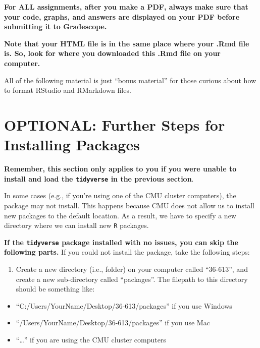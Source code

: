 \documentclass[
]{article}
\providecommand{\tightlist}{%
  \setlength{\itemsep}{0pt}\setlength{\parskip}{0pt}}
\begin{document}
\textbf{For ALL assignments, after you make a PDF, always make sure that
your code, graphs, and answers are displayed on your PDF before
submitting it to Gradescope.}

\textbf{Note that your HTML file is in the same place where your .Rmd
file is. So, look for where you downloaded this .Rmd file on your
computer.}

All of the following material is just ``bonus material'' for those
curious about how to format RStudio and RMarkdown files.

\hypertarget{optional-further-steps-for-installing-packages}{%
\section{OPTIONAL: Further Steps for Installing
Packages}\label{optional-further-steps-for-installing-packages}}

\textbf{Remember, this section only applies to you if you were unable to
install and load the \texttt{tidyverse} in the previous section}.

In some cases (e.g., if you're using one of the CMU cluster computers),
the package may not install. This happens because CMU does not allow us
to install new packages to the default location. As a result, we have to
specify a new directory where we can install new \texttt{R} packages.

\textbf{If the \texttt{tidyverse} package installed with no issues, you
can skip the following parts.} If you could not install the package,
take the following steps:

\begin{enumerate}
\def\labelenumi{\alph{enumi}.}
\tightlist
\item
  Create a new directory (i.e., folder) on your computer called
  ``36-613'', and create a new sub-directory called ``packages''. The
  filepath to this directory should be something like:
\end{enumerate}

\begin{itemize}
\tightlist
\item
  ``C:/Users/YourName/Desktop/36-613/packages'' if you use Windows
\item
  ``/Users/YourName/Desktop/36-613/packages'' if you use Mac
\item
  ``\ldots{}'' if you are using the CMU cluster computers
\end{itemize}
\end{document}
